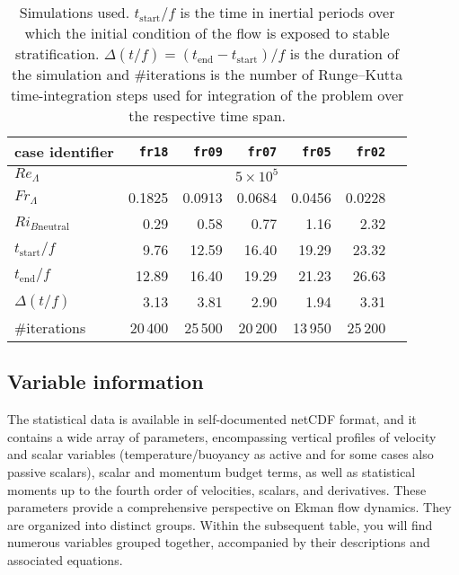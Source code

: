 \documentclass[11pt]{article}
\begin{document}
\begin{table}[H]
    \centering
    \begin{tabular}{lrrrrrr}
        \toprule  
        case identifier&            \texttt{fr18}& \texttt{fr09}& \texttt{fr07}& \texttt{fr05}& \texttt{fr02}\\        
        \bottomrule
        $Re_\Lambda$&                   \multicolumn{5}{c}{$5\times 10^{5}$}\\
        $Fr_{\Lambda}$&             0.1825&	0.0913&	    0.0684&	0.0456&	0.0228\\
        $Ri_{B\text{neutral}}$& 0.29&	0.58&	    0.77&	1.16&	2.32\\
        \hline
        $t_\text{start}/f$&	         9.76&	12.59&	    16.40&	19.29&	23.32\\
        $t_\text{end} /f$&	        12.89&	16.40&      19.29&	21.23&	26.63\\
        $\Delta(t/f)$&	             3.13&	3.81&	    2.90&	1.94&	3.31\\
        \hline
        $\#$iterations&	                20\,400&	25\,500&	    20\,200&	13\,950&	25\,200\\
\toprule            \end{tabular}
    \caption{Simulations used. $t_{\text{start}}/f$ is the time in inertial periods over which the initial 
    condition of the flow is exposed to stable stratification. $\Delta(t/f) = (t_{\text{end}} - t_{\text{start}})/f$  
    is the duration of the simulation and $\#\text{iterations}$ is the number of Runge--Kutta time-integration steps 
    used for integration of the problem over the respective time span.}
    \label{tab:cases}
\end{table} 

\subsection{Variable information}

The statistical data is available in self-documented netCDF format, and it contains a wide array of parameters, encompassing vertical profiles of velocity and scalar variables (temperature/buoyancy as active and for some cases also passive scalars), scalar and momentum budget terms, as well as statistical moments up to the fourth order of velocities, scalars, and derivatives. These parameters provide a comprehensive perspective on Ekman flow dynamics. They are organized into distinct groups. Within the subsequent table, you will find numerous variables grouped together, accompanied by their descriptions and associated equations.
\end{document}
